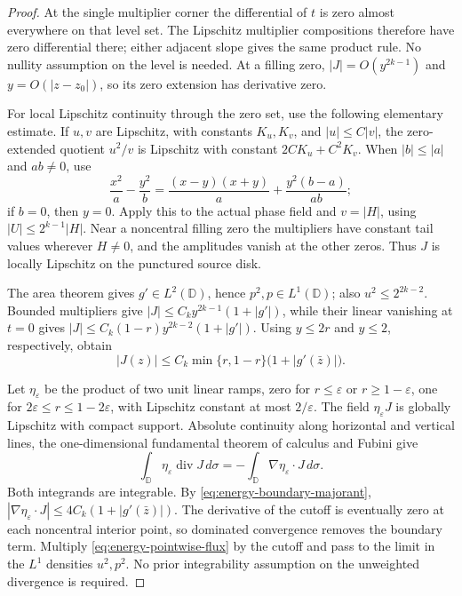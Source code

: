 \documentclass[11pt]{article}
\newcommand{\D}{\mathbb D}
\begin{document}
\begin{proof}
		At the single multiplier corner the differential of $t$ is zero almost
		everywhere on that level set.  The Lipschitz multiplier compositions
		therefore have zero differential there; either adjacent slope gives
		the same product rule.  No nullity assumption on the level is needed.
		At a filling zero, $|J|=O(y^{2k-1})$ and $y=O(|z-z_0|)$,
		so its zero extension has derivative zero.
		
		For local Lipschitz continuity through the zero set, use the following
		elementary estimate.  If $u,v$ are Lipschitz, with constants
		$K_u,K_v$, and $|u|\leq C|v|$, the zero-extended quotient $u^2/v$
		is Lipschitz with constant $2CK_u+C^2K_v$.  When $|b|\leq|a|$
		and $ab\ne0$, use
		\[
		\frac{x^2}{a}-\frac{y^2}{b}
		=\frac{(x-y)(x+y)}a+\frac{y^2(b-a)}{ab};
		\]
		if $b=0$, then $y=0$.  Apply this to the actual phase field and
		$v=|H|$, using $|U|\leq2^{k-1}|H|$.
		Near a noncentral filling zero the multipliers have constant tail
		values wherever $H\ne0$, and the amplitudes vanish at the other
		zeros.  Thus $J$ is locally Lipschitz on the punctured source disk.
		
		The area theorem gives $g'\in L^2(\D)$, hence $p^2,p\in L^1(\D)$;
		also $u^2\leq2^{2k-2}$.  Bounded multipliers give
		$|J|\leq C_k y^{2k-1}(1+|g'|)$, while their linear vanishing
		at $t=0$ gives $|J|\leq C_k(1-r)y^{2k-2}(1+|g'|)$.
		Using $y\leq2r$ and $y\leq2$, respectively, obtain
		\begin{equation}\label{eq:energy-boundary-majorant}
			|J(z)|\leq C_k\min\{r,1-r\}\bigl(1+|g'(\bar z)|\bigr).
		\end{equation}
		
		Let $\eta_\varepsilon$ be the product of two unit linear ramps,
		zero for $r\leq\varepsilon$ or $r\geq1-\varepsilon$, one for
		$2\varepsilon\leq r\leq1-2\varepsilon$, with Lipschitz constant
		at most $2/\varepsilon$.  The field $\eta_\varepsilon J$ is
		globally Lipschitz with compact support.  Absolute continuity along
		horizontal and vertical lines, the one-dimensional fundamental
		theorem of calculus and Fubini give
		\[
		\int_\D\eta_\varepsilon\operatorname{div}J\,d\sigma
		=-\int_\D\nabla\eta_\varepsilon\cdot J\,d\sigma.
		\]
		Both integrands are integrable.  By
		\eqref{eq:energy-boundary-majorant},
		$|\nabla\eta_\varepsilon\cdot J|
		\leq4C_k(1+|g'(\bar z)|)$.
		The derivative of the cutoff is eventually zero at each noncentral
		interior point, so dominated convergence removes the boundary term.
		Multiply \eqref{eq:energy-pointwise-flux} by the cutoff and pass to
		the limit in the $L^1$ densities $u^2,p^2$.  No prior integrability
		assumption on the unweighted divergence is required.
	\end{proof}
	
\end{document}
